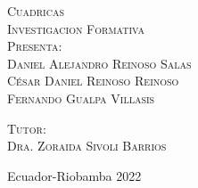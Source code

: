 \documentclass[12pt,a4paper,oneside]{book}
\begin{document}
\begin{titlepage}
\begin{minipage}[c][0.81\textheight][t]{0.75\textwidth}
\begin{center}
            {\large\scshape Cuadricas}\\[.2in]
            \vspace{2cm}
            \textsc{\large Investigacion Formativa}\\[0.5cm]
            \textsc{\large Presenta:}\\[0.5cm]
            \textsc{\large {Daniel Alejandro Reinoso Salas \\
                    César Daniel Reinoso Reinoso\\
                    Fernando Gualpa Villasis}}\\[2cm]

            \vspace{0.5cm}

             {\large\scshape Tutor:\\[0.3cm] {Dra.   Zoraida Sivoli Barrios }}\\[.2in]

            \vspace{0.5cm}

            \large{Ecuador-Riobamba }{2022}
        \end{center}
    \end{minipage}
\end{titlepage}
\tableofcontents
\listoffigures
\newpage



\printbibliography[heading=bibintoc,
title={Bibliografía}]
\end{document}
